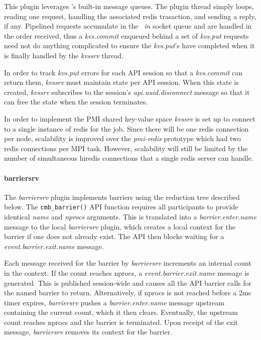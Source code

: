 This plugin leverages \zMQ's built-in message queues.  The plugin thread
simply loops, reading one request, handling the associated redis trasaction,
and sending a reply, if any.  Pipelined requests accumulate in the \zMQ\ 
{\em in} socket queue and are handled in the order received, thus a
{\em kvs.commit} enqueued behind a set of {\em kvs.put} requests need
not do anything complicated to ensure the {\em kvs.put}'s have completed 
when it is finally handled by the {\em kvssrv} thread.

In order to track {\em kvs.put} errors for each API session so that a
{\em kvs.commit} can return them, {\em kvssrv} must maintain state per
API session.  When this state is created, {\em kvssrv} subscribes to
the session's {\em api.uuid.disconnect} message so that it can free
the state when the session terminates.

In order to implement the PMI shared key-value space {\em kvssrv}
is set up to connect to a single instance of redis for the job.
Since there will be one redis connection per node, scalability is improved
over the {\em pmi-redis} prototype which had two redis connections per
MPI task.  However, scalability will still be limited by the number
of simultaneous hiredis connections that a single redis server can handle.

\paragraph{barriersrv}
The {\em barriersrv} plugin implements barriers using the reduction
tree described below.   The {\tt cmb\_barrier()} API function requires
all participants to provide identical {\em name} and {\em nprocs} arguments.
This is translated into a {\em barrier.enter.name} message to the local
{\em barriersrv} plugin, which creates a local context for the barrier
if one does not already exist.  The API then blocks waiting for a
{\em event.barrier.exit.name} message.

Each message received for the barrier by {\em barriersrv} increments
an internal count in the context.  If the count reaches nprocs,
a {\em event.barrier.exit.name} message is generated.  This is published
session-wide and causes all the API barrier calls for the named barrier
to return.  Alternatively, if nprocs is not reached before a 2ms timer
expires, {\em barriersrv} pushes a {\em barrier.enter.name} message upstream
containing the current count, which it then clears.  Eventually, the upstream
count reaches nprocs and the barrier is terminated.  Upon receipt of the
exit message, {\em barriersrv} removes its context for the barrier.

